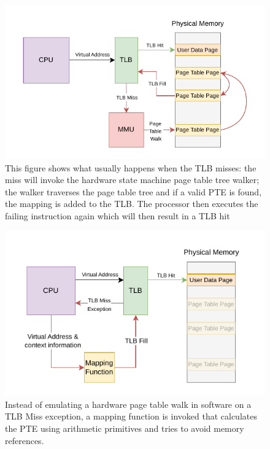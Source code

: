 \begin{figure}[ht!]
    \centering
    \includegraphics[scale=1.5]{figures/theory_normal_tlb_miss.pdf}
    \caption[Usual TLB Miss]{This figure shows what usually happens when the TLB misses:
        the miss will invoke the hardware state machine page table tree walker; the walker traverses
        the page table tree and if a valid PTE is found, the mapping is added to the TLB. The processor
        then executes the failing instruction again which will then result in a TLB hit}
    \label{fig:theory:normal_tlb_miss}
\end{figure}
\begin{figure}[ht!]
    \centering
    \includegraphics[scale=1.5]{figures/theory_mapping_fx.pdf}
    \caption[Virtual Memory using a mapping function]{Instead of emulating a hardware page table walk in software on
        a TLB Miss exception, a mapping function is invoked that calculates the PTE using arithmetic primitives and tries
        to avoid memory references.}
    \label{fig:theory:mapping_fx}
\end{figure}

